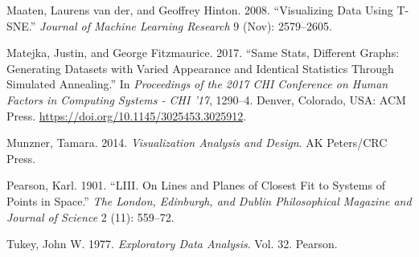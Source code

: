 \documentclass[11,]{article}
\begin{document}
\leavevmode\hypertarget{ref-maaten_visualizing_2008}{}%
Maaten, Laurens van der, and Geoffrey Hinton. 2008. ``Visualizing Data Using T-SNE.'' \emph{Journal of Machine Learning Research} 9 (Nov): 2579--2605.

\leavevmode\hypertarget{ref-matejka_same_2017}{}%
Matejka, Justin, and George Fitzmaurice. 2017. ``Same Stats, Different Graphs: Generating Datasets with Varied Appearance and Identical Statistics Through Simulated Annealing.'' In \emph{Proceedings of the 2017 CHI Conference on Human Factors in Computing Systems - CHI '17}, 1290--4. Denver, Colorado, USA: ACM Press. \url{https://doi.org/10.1145/3025453.3025912}.

\leavevmode\hypertarget{ref-munzner_visualization_2014}{}%
Munzner, Tamara. 2014. \emph{Visualization Analysis and Design}. AK Peters/CRC Press.

\leavevmode\hypertarget{ref-pearson_liii._1901}{}%
Pearson, Karl. 1901. ``LIII. On Lines and Planes of Closest Fit to Systems of Points in Space.'' \emph{The London, Edinburgh, and Dublin Philosophical Magazine and Journal of Science} 2 (11): 559--72.

\leavevmode\hypertarget{ref-tukey_exploratory_1977}{}%
Tukey, John W. 1977. \emph{Exploratory Data Analysis}. Vol. 32. Pearson.
\end{document}
